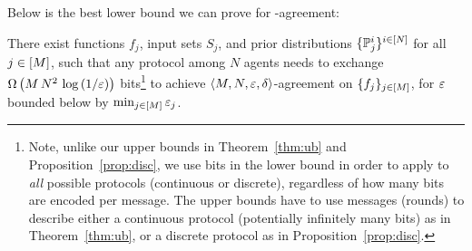 Below is the best lower bound we can prove for \agree-agreement:
\begin{proposition}\label{prop:lb}
There exist functions $f_j$, input sets $S_j$, and prior distributions $\{\mathbb{P}_j^i\}^{i \in [N]}$ for all $j \in [M]$, such that any protocol among $N$ agents needs to exchange $\Omega\left(M\,N^2\,\log\left(1/\varepsilon\right)\right)$ bits\footnote{Note, unlike our upper bounds in Theorem~\ref{thm:ub} and Proposition~\ref{prop:disc}, we use bits in the lower bound in order to apply to \emph{all} possible protocols (continuous or discrete), regardless of how many bits are encoded per message. The upper bounds have to use messages (rounds) to describe either a continuous protocol (potentially infinitely many bits) as in Theorem~\ref{thm:ub}, or a discrete protocol as in Proposition~\ref{prop:disc}.} to achieve $\left \langle M, N, \varepsilon, \delta \right \rangle $-agreement on $\{f_j\}_{j \in [M]}$, for $\varepsilon$ bounded below by $\min_{j\in[M]} \varepsilon_j$.
\end{proposition}
